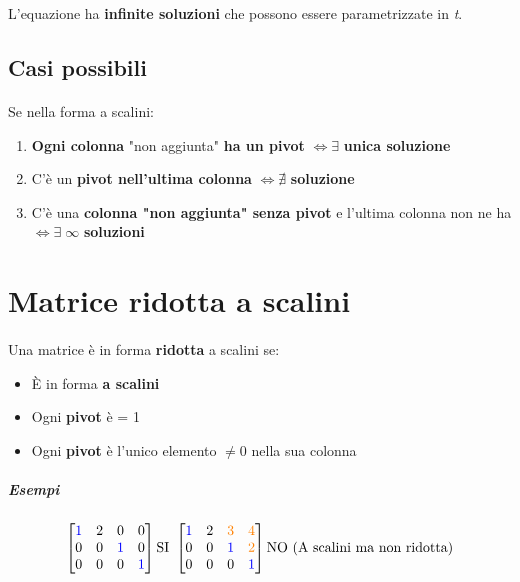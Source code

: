 \documentclass[a4paper, 12pt]{report}
\begin{document}
            L'equazione ha \textbf{infinite soluzioni} che possono essere parametrizzate in \textit{t}.
            \subsection{Casi possibili}
            \paragraph{}Se nella forma a scalini:
                \begin{enumerate}
                    \item \textbf{Ogni colonna} "non aggiunta" \textbf{ha un pivot} $\Leftrightarrow \exists$ \textbf{unica soluzione}
                    \item C'è un \textbf{pivot nell'ultima colonna} $\Leftrightarrow \nexists$ \textbf{soluzione}
                    \item C'è una \textbf{colonna "non aggiunta" senza pivot} e l'ultima colonna non ne ha $\Leftrightarrow \exists \; \infty$ \textbf{soluzioni} 
                \end{enumerate}
        \clearpage
        \section{Matrice ridotta a scalini}
            \paragraph{}Una matrice è in forma \textbf{ridotta} a scalini se:
                \begin{itemize}
                    \item È in forma \textbf{a scalini}
                    \item Ogni \textbf{pivot} è = 1
                    \item Ogni \textbf{pivot} è l'unico elemento $\neq 0$ nella sua colonna
                \end{itemize}
                \subparagraph{Esempi}
                $$
                \begin{bmatrix}
                    \textcolor{blue}{1} & 2 & 0 & 0\\
                    0 & 0 & \textcolor{blue}1 & 0\\
                    0 & 0 & 0 & \textcolor{blue}{1}
                \end{bmatrix}
                \text{SI }
                \begin{bmatrix}
                    \textcolor{blue}{1} & 2 & \textcolor{orange}{3} & \textcolor{orange}{4}\\
                    0 & 0 & \textcolor{blue}{1} & \textcolor{orange}{2}\\
                    0 & 0 & 0 & \textcolor{blue}{1}
                \end{bmatrix}
                \text{NO (A scalini ma non ridotta)}
                $$
\end{document}
